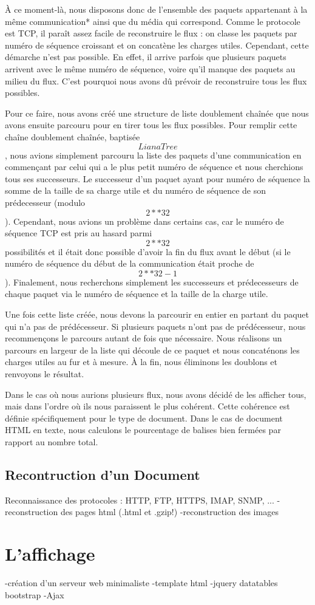 \indent À ce moment-là, nous disposons donc de l'ensemble des paquets appartenant à la même communication* ainsi que du média qui correspond. Comme le protocole est TCP,
il paraît assez facile de reconstruire le flux : on classe les paquets par numéro de séquence croissant et on concatène les charges utiles. Cependant, cette démarche 
n'est pas possible. En effet, il arrive parfois que plusieurs paquets arrivent avec le même numéro de séquence, voire qu'il manque des paquets au milieu du flux.
C'est pourquoi nous avons dû prévoir de reconstruire tous les flux possibles.


\indent Pour ce faire, nous avons créé une structure de liste doublement chaînée que nous avons ensuite parcouru pour en tirer tous les flux possibles. Pour remplir cette chaîne
doublement chaînée, baptisée $$LianaTree$$, nous avions simplement parcouru la liste des paquets d'une communication en commençant par celui qui a le plus petit numéro de séquence et 
nous cherchions tous ses successeurs. Le successeur d'un paquet ayant pour numéro de séquence la somme de la taille de sa charge utile et du numéro de séquence de son prédecesseur 
(modulo $$2**32$$).
Cependant, nous avions un problème dans certains cas, car le numéro de séquence TCP est pris au hasard parmi $$2**32$$ possibilités et il était donc possible d'avoir la fin du flux 
avant le début (si le numéro de séquence du début de la communication était proche de $$2**32 -1$$). Finalement, nous recherchons simplement les successeurs et prédecesseurs de chaque
paquet via le numéro de séquence et la taille de la charge utile.

Une fois cette liste créée, nous devons la parcourir en entier en partant du paquet qui n'a pas de prédécesseur. Si plusieurs paquets n'ont pas de prédécesseur, nous recommençons le parcours autant de fois que nécessaire. Nous réalisons un parcours en largeur de la liste qui découle de ce paquet et nous concaténons les charges utiles au fur et à mesure. À la fin, nous éliminons
 les doublons et renvoyons le résultat.



Dans le cas où nous aurions plusieurs flux, nous avons décidé de les afficher tous, mais dans l'ordre où ils nous paraissent le plus cohérent. Cette cohérence est définie spécifiquement 
pour le type de document. Dans le cas de document HTML en texte, nous calculons le pourcentage de balises bien fermées par rapport au nombre total.

\subsection{Recontruction d'un Document}
Reconnaissance des protocoles : HTTP, FTP, HTTPS, IMAP, SNMP, ...
-reconstruction des pages html (.html et .gzip!)
-reconstruction des images

\section{L'affichage}
-création d'un serveur web minimaliste
-template html
-jquery datatables bootstrap
-Ajax
